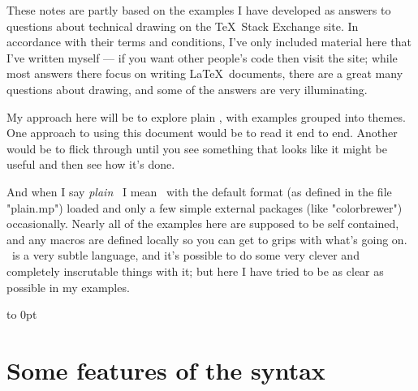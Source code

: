 \documentclass[a4paper,landscape]{article}
\begin{document}
These notes are partly based on the examples I have developed as answers
to questions about technical drawing on the \TeX\ Stack Exchange site.  In
accordance with their terms and conditions, I’ve only included material here that
I’ve written myself --- if you want other people’s code then visit the site;
while most answers there focus on writing \LaTeX\ documents, there are a great
many questions about drawing, and some of the answers are very illuminating.

My approach here will be to explore plain \MP, with examples grouped
into themes.  One approach to using this document would be to read it end to end.
Another would be to flick through until you see something that looks like it might
be useful and then see how it’s done.

And when I say \textit{plain} \MP\ I mean \MP\ with the default format (as defined
in the file "plain.mp") loaded and only a few simple external packages (like
"colorbrewer") occasionally.  Nearly all of the examples here are supposed to be self
contained, and any macros are defined locally so you can get to grips with what’s
going on.  \MP\ is a very subtle language, and it’s possible to do some very clever
and completely inscrutable things with it;  but here I have tried to be as clear as
possible in my examples.

\vbox to 0pt{
\vskip 1in
\noindent
\begingroup\footnotesize{}\endgroup\par\vss}

\newpage
\section{Some features of the syntax}
\end{document}
